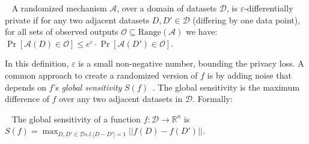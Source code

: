 \begin{definition}~\label{def:differential_privacy}
A randomized mechanism $\mathcal{A}$, over a domain of datasets $\mathcal{D}$, is $\varepsilon$-differentially private if for any two adjacent datasets $D,D'\in \mathcal{D}$ (differing by one data point), for all sets of observed outputs $\mathcal{O} \subseteq \text{Range}(\mathcal{A})$ we have:  $\Pr[\mathcal{A}(D) \in \mathcal{O}] \leq e^{\varepsilon} \cdot \Pr[\mathcal{A}(D') \in \mathcal{O}]$. 
\end{definition}
In this definition, $\varepsilon$ is a small non-negative number, bounding the privacy loss. %
A common approach to create a randomized version of $f$ is by adding noise that depends on $f$'s \emph{global sensitivity}
$S(f)$~\citep{Dwork06,ref_22,ref_58,ref_36,ref_37}. The global sensitivity is the maximum difference of $f$ over any two adjacent datasets in $\mathcal{D}$. Formally: 

\begin{definition}~\label{def:globall_sensitivity}
The global sensitivity of a function $f:\mathcal{D}\rightarrow \mathbb{R}^n$ is \\
$S(f)=\max_{D,D'\in \mathcal{D} s.t. |D-D'|= 1}{||f(D)-f(D')||}$.
\end{definition}

